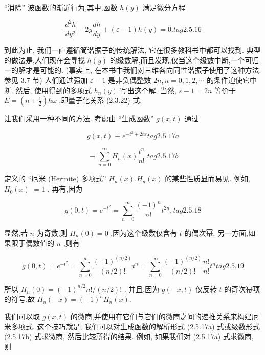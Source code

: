 \documentclass[lang=cn,newtx,10pt,scheme=chinese,thmcnt=section]{elegantbook}
\begin{document}
“消除” 波函数的渐近行为,其中,函数 $h\left( y\right)$ 满足微分方程

$$
\frac{{d}^{2}h}{d{y}^{2}} - {2y}\frac{dh}{dy} + \left( {\varepsilon - 1}\right) h\left( y\right) = 0. tag{2.5.16}
$$

到此为止, 我们一直遵循简谐振子的传统解法, 它在很多教科书中都可以找到. 典型的做法是,人们现在会寻找 $h\left( y\right)$ 的级数解,而且发现,仅当这个级数中断,一个可归一的解才是可能的. (事实上, 在本书中我们对三维各向同性谐振子使用了这种方法. 参见 3.7 节) 人们通过强加 $\varepsilon - 1$ 是非负偶整数 ${2n}, n = 0,1,2,\cdots$ 的条件迫使它中断. 然后, 使用得到的多项式 ${h}_{n}\left( y\right)$ 写出这个解. 当然, $\varepsilon - 1 = {2n}$ 等价于 $E = \left( {n + \frac{1}{2}}\right) \hbar \omega$ ,即量子化关系 (2.3.22) 式.

让我们采用一种不同的方法. 考虑由 “生成函数” $g\left( {x, t}\right)$ 通过

$$
g\left( {x, t}\right) \equiv {e}^{-{t}^{2} + {2tx}} tag{2.5.17a}
$$

$$
\equiv \mathop{\sum }\limits_{{n = 0}}^{\infty }{H}_{n}\left( x\right) \frac{{t}^{n}}{n!}. tag{2.5.17b}
$$

定义的 “厄米 (Hermite) 多项式” ${H}_{n}\left( x\right) .{H}_{n}\left( x\right)$ 的某些性质显而易见. 例如, ${H}_{0}\left( x\right)$ $= 1$ . 再有,因为

$$
g\left( {0, t}\right) = {e}^{-{t}^{2}} = \mathop{\sum }\limits_{{n = 0}}^{\infty }\frac{{\left( -1\right) }^{n}}{n!}{t}^{2n}, tag{2.5.18}
$$

显然,若 $n$ 为奇数,则 ${H}_{n}\left( 0\right) = 0$ ,因为这个级数仅含有 $t$ 的偶次幂. 另一方面,如果限于偶数值的 $n$ ,则有

$$
g\left( {0, t}\right) = {e}^{-{t}^{2}} = \mathop{\sum }\limits_{{n = 0}}^{\infty }\frac{{\left( -1\right) }^{\left( n/2\right) }}{\left( {n/2}\right) !}{t}^{n} = \mathop{\sum }\limits_{{n = 0}}^{\infty }\frac{{\left( -1\right) }^{\left( n/2\right) }}{\left( {n/2}\right) !}\frac{n!}{n!}{t}^{n} tag{2.5.19}
$$

所以 ${H}_{n}\left( 0\right) = {\left( -1\right) }^{n/2}n!/\left( {n/2}\right) !$ . 并且,因为 $g\left( {-x, t}\right)$ 仅反转 $t$ 的奇次幂项的符号,故 ${H}_{n}\left( {-x}\right) = {\left( -1\right) }^{n}{H}_{n}\left( x\right) .$

我们可以取 $g\left( {x, t}\right)$ 的微商,并使用在它们与它们的微商之间的递推关系来构建厄米多项式. 这个技巧就是, 我们可以对生成函数的解析形式 (2.5.17a) 式或级数形式 (2.5.17b) 式求微商, 然后比较所得的结果. 例如, 如果我们对 (2.5.17a) 式求微商, 则
\end{document}
